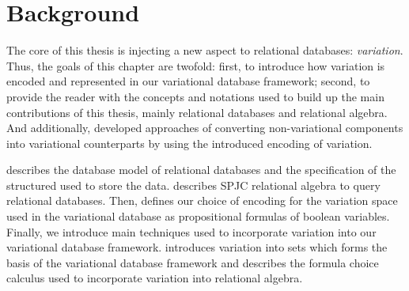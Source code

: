 \chapter{Background}
\label{ch:bg}

The core of this thesis is injecting a new aspect to relational databases: \emph{variation}.
Thus, the goals of this chapter are twofold: 
%
first, to introduce how variation is encoded and represented in our variational database framework;
%
second, to provide the reader with the concepts and notations
used to build up the main contributions of this thesis, mainly relational databases and
relational algebra.
%
And additionally, developed approaches of converting non-variational components into
variational counterparts by using the introduced encoding of variation. 

%
 describes the database model of relational databases and the specification of
the structured used to store the data.  describes SPJC relational algebra to query
relational databases. 
%
Then, 
 defines our choice of encoding for the variation space used in the 
variational database as propositional formulas of boolean variables.
%
Finally, we introduce main techniques used to incorporate variation into our variational 
database framework.
 introduces variation into sets which forms the basis of the variational database
framework and  describes the formula choice calculus used to incorporate 
variation into relational algebra.



%




